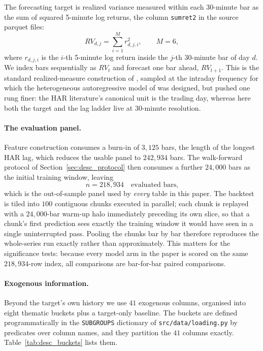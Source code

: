 The forecasting target is realized variance measured within each 30-minute bar
as the sum of squared 5-minute log returns, the column \texttt{sumret2} in the
source parquet files:
\begin{equation}
    RV_{d,j} = \sum_{i=1}^{M} r_{d,j,i}^{2}, \qquad M = 6,
    \label{eq:desc_rv}
\end{equation}
where $r_{d,j,i}$ is the $i$-th 5-minute log return inside the $j$-th 30-minute
bar of day $d$. We index bars sequentially as $RV_t$ and forecast one bar ahead,
$RV_{t+1}$. This is the standard realized-measure construction of
\citet{AndersenBollerslevDieboldLabys2003}, sampled at the intraday frequency
for which the heterogeneous autoregressive model of \citet{Corsi2009} was
designed, but pushed one rung finer: the HAR literature's canonical unit is the
trading day, whereas here both the target and the lag ladder live at 30-minute
resolution.

\paragraph{The evaluation panel.}
Feature construction consumes a burn-in of $3{,}125$ bars, the length of the
longest HAR lag, which reduces the usable panel to $242{,}934$ bars.
The walk-forward protocol of Section~\ref{sec:desc_protocol} then consumes a
further $24{,}000$ bars as the initial training window, leaving
\begin{equation}
    n = 218{,}934 \quad \text{evaluated bars,}
    \label{eq:desc_n}
\end{equation}
which is the out-of-sample panel used by \emph{every} table in this paper.
The backtest is tiled into $100$ contiguous chunks executed in parallel; each
chunk is replayed with a $24{,}000$-bar warm-up halo immediately preceding its
own slice, so that a chunk's first prediction sees exactly the training window it
would have seen in a single uninterrupted pass. Pooling the chunks bar by bar
therefore reproduces the whole-series run exactly rather than approximately.
This matters for the significance tests: because every model arm in the paper is
scored on the same $218{,}934$-row index, all comparisons are bar-for-bar
paired comparisons.

\paragraph{Exogenous information.}
Beyond the target's own history we use $41$ exogenous columns, organised into
eight thematic buckets plus a target-only baseline. The buckets are defined
programmatically in the \texttt{SUBGROUPS} dictionary of
\texttt{src/data/loading.py} by predicates over column names, and they partition
the $41$ columns exactly. Table~\ref{tab:desc_buckets} lists them.

